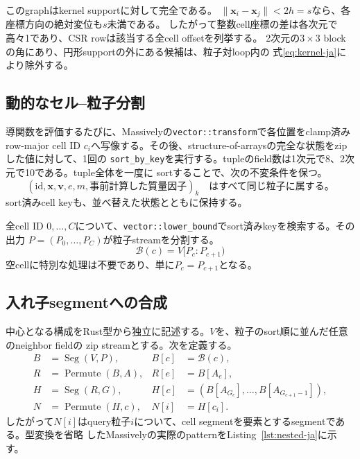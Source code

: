 \documentclass[a4paper,10pt]{ltjsarticle}
\newcommand{\code}[1]{\texttt{#1}}
\newcommand{\Seg}{\operatorname{Seg}}
\newcommand{\Perm}{\operatorname{Permute}}
\begin{document}
このgraphはkernel supportに対して完全である。
$\lVert\mathbf{x}_i-\mathbf{x}_j\rVert<2h=s$なら、各座標方向の絶対変位も$s$未満である。
したがって整数cell座標の差は各次元で高々1であり、CSR rowは該当する全cell offsetを列挙する。
2次元の$3\times3$ blockの角にあり、円形supportの外にある候補は、粒子対loop内の
式\eqref{eq:kernel-ja}により除外する。

\subsection{動的なセル--粒子分割}

導関数を評価するたびに、Massivelyの\code{vector::transform}で各位置をclamp済みrow-major
cell ID $c_i$へ写像する。その後、structure-of-arraysの完全な状態をzipした値に対して、1回の
\code{sort\_by\_key}を実行する。tupleのfield数は1次元で8、2次元で10である。tuple全体を一度に
sortすることで、次の不変条件を保つ。
\begin{equation}
  (\mathrm{id},\mathbf{x},\mathbf{v},e,m,\text{事前計算した質量因子})_k
  \quad\text{はすべて同じ粒子に属する。}
\end{equation}
sort済みcell keyも、並べ替えた状態とともに保持する。

全cell ID $0,\ldots,C$について、\code{vector::lower\_bound}でsort済みkeyを検索する。その出力
$P=(P_0,\ldots,P_C)$が粒子streamを分割する。
\begin{equation}
 \mathcal{B}(c)=V[P_c:P_{c+1})
 \label{eq:cell-particles-ja}
\end{equation}
空cellに特別な処理は不要であり、単に$P_c=P_{c+1}$となる。

\subsection{入れ子segmentへの合成}

中心となる構成をRust型から独立に記述する。$V$を、粒子のsort順に並んだ任意のneighbor fieldの
zip streamとする。次を定義する。
\begin{align}
 B &= \Seg(V,P),
   & B[c] &= \mathcal{B}(c),\\
 R &= \Perm(B,A),
   & R[e] &= B[A_e],\\
 H &= \Seg(R,G),
   & H[c] &= (B[A_{G_c}],\ldots,B[A_{G_{c+1}-1}]),\\
 N &= \Perm(H,c),
   & N[i] &= H[c_i].
 \label{eq:nested-ja}
\end{align}
したがって$N[i]$はquery粒子$i$について、cell segmentを要素とするsegmentである。型変換を省略
したMassivelyの実際のpatternをListing~\ref{lst:nested-ja}に示す。
\end{document}
